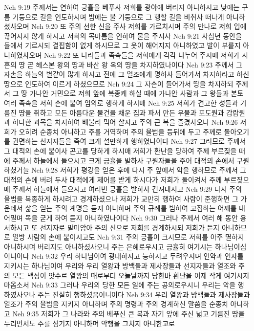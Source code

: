 Neh 9:19  주께서는 연하여 긍휼을 베푸사 저희를 광야에 버리지 아니하시고 낮에는 구름 기둥으로 길을 인도하시며 밤에는 불 기둥으로 그 행할 길을 비취사 떠나게 아니하셨사오며
Neh 9:20  또 주의 선한 신을 주사 저희를 가르치시며 주의 만나로 저희 입에 끊어지지 않게 하시고 저희의 목마름을 인하여 물을 주시사
Neh 9:21  사십년 동안을 들에서 기르시되 결핍함이 없게 하시므로 그 옷이 해어지지 아니하였고 발이 부릍지 아니하였사오며
Neh 9:22  또 나라들과 족속들을 저희에게 각각 나누어 주시매 저희가 시혼의 땅 곧 헤스본 왕의 땅과 바산 왕 옥의 땅을 차지하였나이다
Neh 9:23  주께서 그 자손을 하늘의 별같이 많게 하시고 전에 그 열조에게 명하사 들어가서 차지하라고 하신 땅으로 인도하여 이르게 하셨으므로
Neh 9:24  그 자손이 들어가서 땅을 차지하되 주께서 그 땅 가나안 거민으로 저희 앞에 복종케 하실 때에 가나안 사람과 그 왕들과 본토 여러 족속을 저희 손에 붙여 임의로 행하게 하시매
Neh 9:25  저희가 견고한 성들과 기름진 땅을 취하고 모든 아름다운 물건을 채운 집과 파서 만든 우물과 포도원과 감람원과 허다한 과목을 차지하여 배불리 먹어 살지고 주의 큰 복을 즐겼사오나
Neh 9:26  저희가 오히려 순종치 아니하고 주를 거역하며 주의 율법을 등뒤에 두고 주께로 돌아오기를 권면하는 선지자들을 죽여 크게 설만하게 행하였나이다
Neh 9:27  그러므로 주께서 그 대적의 손에 붙이사 곤고를 당하게 하시매 저희가 환난을 당하여 주께 부르짖을 때에 주께서 하늘에서 들으시고 크게 긍휼을 발하사 구원자들을 주어 대적의 손에서 구원하셨거늘
Neh 9:28  저희가 평강을 얻은 후에 다시 주 앞에서 악을 행하므로 주께서 그 대적의 손에 버려 두사 대적에게 제어를 받게 하시다가 저희가 돌이켜서 주께 부르짖으매 주께서 하늘에서 들으시고 여러번 긍휼을 발하사 건져내시고
Neh 9:29  다시 주의 율법을 복종하게 하시려고 경계하셨으나 저희가 교만히 행하여 사람이 준행하면 그 가운데서 삶을 얻는 주의 계명을 듣지 아니하며 주의 규례를 범하여 고집하는 어깨를 내어밀며 목을 굳게 하여 듣지 아니하였나이다
Neh 9:30  그러나 주께서 여러 해 동안 용서하시고 또 선지자로 말미암아 주의 신으로 저희를 경계하시되 저희가 듣지 아니하므로 열방 사람의 손에 붙이시고도
Neh 9:31  주의 긍휼이 크시므로 저희를 아주 멸하지 아니하시며 버리지도 아니하셨사오니 주는 은혜로우시고 긍휼히 여기시는 하나님이심이니이다
Neh 9:32  우리 하나님이여 광대하시고 능하시고 두려우시며 언약과 인자를 지키시는 하나님이여 우리와 우리 열왕과 방백들과 제사장들과 선지자들과 열조와 주의 모든 백성이 앗수르 열왕의 때로부터 오늘날까지 당한바 환난을 이제 작게 여기시지 마옵소서
Neh 9:33  그러나 우리의 당한 모든 일에 주는 공의로우시니 우리는 악을 행하였사오나 주는 진실히 행하셨음이니이다
Neh 9:34  우리 열왕과 방백들과 제사장들과 열조가 주의 율법을 지키지 아니하며 주의 명령과 주의 경계하신 말씀을 순종치 아니하고
Neh 9:35  저희가 그 나라와 주의 베푸신 큰 복과 자기 앞에 주신 넓고 기름진 땅을 누리면서도 주를 섬기지 아니하며 악행을 그치지 아니한고로
